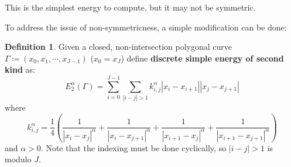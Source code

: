 \documentclass[a4paper]{article}
\theoremstyle{definition}
\newtheorem{definition}{Definition}
\begin{document}
This is the simplest energy to compute, but it may not be symmetric.

To address the issue of non-symmetricness, a simple modification can be done:
\begin{definition}
    Given a closed, non-intersection polygonal curve $\Gamma \coloneqq \left( x_0, x_1, \cdots, x_{J-1} \right)$
    ($x_0 = x_J$)
    define \textbf{discrete simple energy of second kind} as:
    \begin{equation}
        E_{2}^{\alpha}\left( \Gamma \right) = \sum_{i=0}^{J-1} \sum_{|i - j| > 1} k_{i,j}^{\alpha} |x_i - x_{i+1}| |x_j - x_{j+1}|
    \end{equation}
    where
    \begin{equation}
        k_{i,j}^{\alpha} = \frac{1}{4} \left( \frac{1}{|x_i - x_j|^{\alpha}} + \frac{1}{|x_{i} - x_{j+1}|^{\alpha}} + \frac{1}{|x_{i+1} - x_{j}|^{\alpha}} + \frac{1}{|x_{i+1} - x_{j+1}|^{\alpha}} \right)
    \end{equation}
    and $\alpha > 0$.
    Note that the indexing must be done cyclically, so $|i-j| > 1$ is modulo $J$.
\end{definition}
\end{document}

